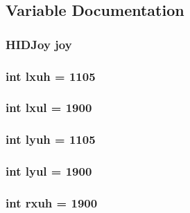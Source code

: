 \subsection{Variable Documentation}
\hypertarget{USBtx_8ino_a007be0d4a5f1eeab33bfa3d8cd1a63a3}{
\subsubsection[{joy}]{\setlength{\rightskip}{0pt plus 5cm}H\-I\-D\-Joy joy}}\label{USBtx_8ino_a007be0d4a5f1eeab33bfa3d8cd1a63a3}
\hypertarget{USBtx_8ino_a4292e7f32256a5c878f8a7947ca07e16}{
\subsubsection[{lxuh}]{\setlength{\rightskip}{0pt plus 5cm}int lxuh = 1105}}\label{USBtx_8ino_a4292e7f32256a5c878f8a7947ca07e16}
\hypertarget{USBtx_8ino_aa6fec60ec2aa8c5a5bafed3a065a138d}{
\subsubsection[{lxul}]{\setlength{\rightskip}{0pt plus 5cm}int lxul = 1900}}\label{USBtx_8ino_aa6fec60ec2aa8c5a5bafed3a065a138d}
\hypertarget{USBtx_8ino_ac705af2d3b08651b36ecd15e80ba2922}{
\subsubsection[{lyuh}]{\setlength{\rightskip}{0pt plus 5cm}int lyuh = 1105}}\label{USBtx_8ino_ac705af2d3b08651b36ecd15e80ba2922}
\hypertarget{USBtx_8ino_a55b62414fa89038f95180ac7a687aefa}{
\subsubsection[{lyul}]{\setlength{\rightskip}{0pt plus 5cm}int lyul = 1900}}\label{USBtx_8ino_a55b62414fa89038f95180ac7a687aefa}
\hypertarget{USBtx_8ino_abfea8543614f15a6f21030432e388719}{
\subsubsection[{rxuh}]{\setlength{\rightskip}{0pt plus 5cm}int rxuh = 1900}}\label{USBtx_8ino_abfea8543614f15a6f21030432e388719}
